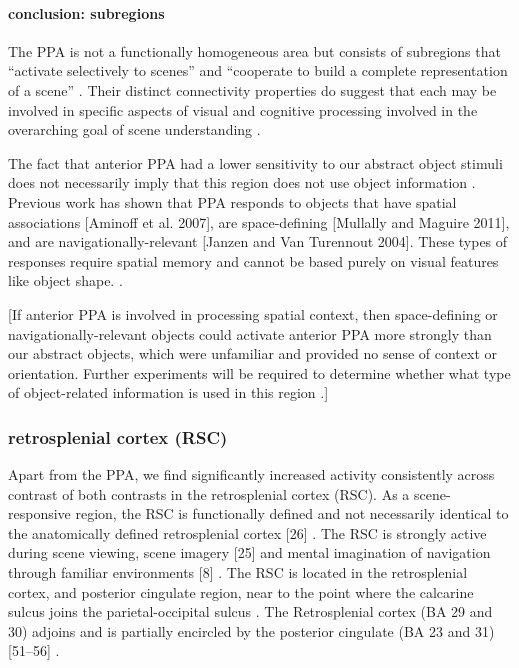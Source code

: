 \documentclass[english]{article}
\begin{document}
\paragraph{conclusion: subregions}

The PPA is not a functionally homogeneous area but consists of
subregions that ``activate selectively to scenes'' and ``cooperate to build a
complete representation of a scene'' \citep{baldassano2013differential}.
%
Their distinct connectivity properties do suggest that each may be
involved in specific aspects of visual and cognitive processing involved in the
overarching goal of scene understanding \citep{baldassano2013differential}.

%
The fact that anterior PPA had a lower sensitivity to our abstract object
stimuli does not necessarily imply that this region does not use object
information \citep{baldassano2013differential}. Previous work has shown that PPA
responds to objects that have spatial associations [Aminoff et al. 2007], are
space-defining [Mullally and Maguire 2011], and are navigationally-relevant
[Janzen and Van Turennout 2004]. These types of responses require spatial memory
and cannot be based purely on visual features like object shape.
\citep{baldassano2013differential}.

%
[If anterior PPA is involved in processing spatial context, then space-defining
or navigationally-relevant objects could activate anterior PPA more strongly
than our abstract objects, which were unfamiliar and provided no sense of
context or orientation.
%
Further experiments will be required to determine whether what type of
object-related information is used in this region
\citep{baldassano2013differential}.]


\subsubsection{retrosplenial cortex (RSC)}



Apart from the PPA, we find significantly increased activity consistently across
contrast of both contrasts in the retrosplenial cortex (RSC).
As a scene-responsive region, the RSC is functionally defined and not
necessarily identical to the anatomically defined retrosplenial cortex [26]
\citep{epstein2008parahippocampal}.
The RSC is strongly active during scene viewing, scene imagery [25] and mental
imagination of navigation through familiar environments [8]
\citep{epstein2008parahippocampal}.
The RSC is located in the retrosplenial cortex, and posterior cingulate region,
near to the point where the calcarine sulcus joins the parietal-occipital sulcus
\citep{epstein2008parahippocampal}.
The Retrosplenial cortex (BA 29 and 30) adjoins and is partially encircled by
the posterior cingulate (BA 23 and 31) [51–56]
\citep{epstein2008parahippocampal}.
\end{document}

